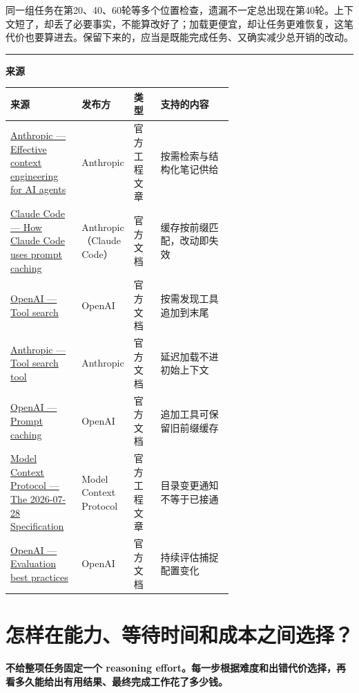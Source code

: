 \documentclass[a4paper,11pt]{ctexart}
\begin{document}
同一组任务在第20、40、60轮等多个位置检查，遗漏不一定总出现在第40轮。上下文短了，却丢了必要事实，不能算改好了；加载更便宜，却让任务更难恢复，这笔代价也要算进去。保留下来的，应当是既能完成任务、又确实减少总开销的改动。

\bigskip\noindent\rule{\linewidth}{0.4pt}\par\smallskip
\begingroup\footnotesize\color{slate}
\textbf{来源}\par\smallskip
\setlength{\tabcolsep}{4pt}\renewcommand{\arraystretch}{1.2}\keepXColumns
\begin{tabularx}{\linewidth}{L{0.32\linewidth} L{0.20\linewidth} L{0.12\linewidth} X}
\toprule
\textbf{来源} & \textbf{发布方} & \textbf{类型} & \textbf{支持的内容} \\
\midrule
\href{https://www.anthropic.com/engineering/effective-context-engineering-for-ai-agents}{Anthropic — Effective context engineering for AI agents} & Anthropic & 官方工程文章 & 按需检索与结构化笔记供给 \\
\href{https://code.claude.com/docs/en/prompt-caching}{Claude Code — How Claude Code uses prompt caching} & Anthropic（Claude Code） & 官方文档 & 缓存按前缀匹配，改动即失效 \\
\href{https://developers.openai.com/api/docs/guides/tools-tool-search}{OpenAI — Tool search} & OpenAI & 官方文档 & 按需发现工具追加到末尾 \\
\href{https://platform.claude.com/docs/en/agents-and-tools/tool-use/tool-search-tool}{Anthropic — Tool search tool} & Anthropic & 官方文档 & 延迟加载不进初始上下文 \\
\href{https://developers.openai.com/api/docs/guides/prompt-caching}{OpenAI — Prompt caching} & OpenAI & 官方文档 & 追加工具可保留旧前缀缓存 \\
\href{https://blog.modelcontextprotocol.io/posts/2026-07-28/}{Model Context Protocol — The 2026-07-28 Specification} & Model Context Protocol & 官方工程文章 & 目录变更通知不等于已接通 \\
\href{https://developers.openai.com/api/docs/guides/evaluation-best-practices}{OpenAI — Evaluation best practices} & OpenAI & 官方文档 & 持续评估捕捉配置变化 \\
\bottomrule
\end{tabularx}
\endgroup

\clearpage
\section{怎样在能力、等待时间和成本之间选择？}
\noindent\textbf{不给整项任务固定一个 reasoning effort。每一步根据难度和出错代价选择，再看多久能给出有用结果、最终完成工作花了多少钱。}\par\medskip
\end{document}
